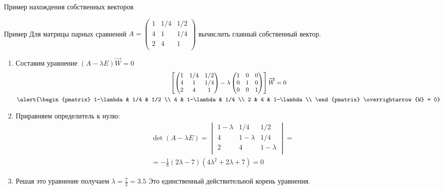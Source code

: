 \documentclass[unicode,11pt,notheorems,xcolor=table]{beamer}
\begin{document}
\begin{frame}[allowframebreaks]{Пример нахождения собственных векторов}
    \begin{exampleblock}{Пример}
        Для матрицы парных сравнений
        $A=\begin{pmatrix}
            1 & 1/4 & 1/2 \\
            4 & 1 & 1/4 \\
            2 & 4  & 1\\
        \end{pmatrix}$
        вычислить главный собственный вектор.
    \end{exampleblock}
    \begin{enumerate}
        \item 
        Составим уравнение $(A-\lambda E)\overrightarrow{W} = 0$
        \begin{gather*}
         \left[ \begin{pmatrix}
            1 & 1/4 & 1/2 \\
            4 & 1 & 1/4 \\
            2 & 4  & 1\\
        \end{pmatrix} 
        - \lambda \begin{pmatrix}
            1 & 0 & 0 \\
            0 & 1 & 0 \\
            0 & 0  & 1\\
        \end{pmatrix}
        \right] \overrightarrow{W} = 0\\
        \alert{\begin{pmatrix}
               1-\lambda & 1/4 & 1/2 \\
               4 & 1-\lambda & 1/4 \\
               2 & 4  & 1-\lambda\\
           \end{pmatrix} 
        \overrightarrow{W} = 0}
        \end{gather*}
    \item 
    Приравняем определитель к нулю:
    \begin{multline*}
     \det(A-\lambda E)
     = \begin{vmatrix}
           1-\lambda & 1/4 & 1/2 \\
           4 & 1-\lambda & 1/4 \\
           2 & 4  & 1-\lambda\\
       \end{vmatrix} 
       =\\
       = -\frac{1}{8} (2\lambda-7)(4{\lambda^2} + 2\lambda+7)
       =0
    \end{multline*}
    \item Решая это уравнение получаем $\lambda =\frac{7}{2}=3.5$ Это единственный действительной корень уравнения.
    

\end{enumerate}
\end{frame}
\end{document}
